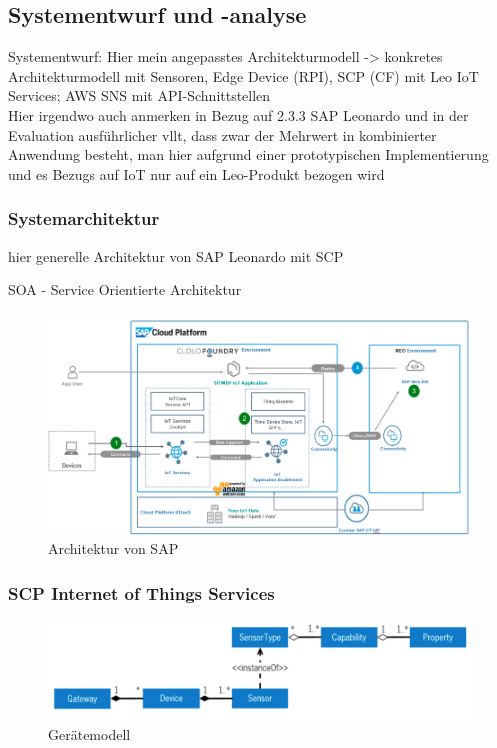 \subsection{Systementwurf und -analyse}
Systementwurf: Hier mein angepasstes Architekturmodell -> konkretes Architekturmodell mit Sensoren, Edge Device (RPI), SCP (CF) mit Leo IoT Services; AWS SNS mit API-Schnittstellen
\\Hier irgendwo auch anmerken in Bezug auf 2.3.3 SAP Leonardo und in der Evaluation ausführlicher vllt, dass zwar der Mehrwert in kombinierter Anwendung besteht, man hier aufgrund einer prototypischen Implementierung und es Bezugs auf IoT nur auf ein Leo-Produkt bezogen wird

\subsubsection{Systemarchitektur}

hier generelle Architektur von SAP Leonardo mit SCP

SOA - Service Orientierte Architektur
\begin{figure}[H]
    \centering
    \includegraphics[width=1.0\linewidth]{pictures/sap_architecture}
    \caption[Referenzarchitektur von SAP]{Architektur von SAP \citep{Ganz2019}}
    \label{fig:filename_without_extension}
\end{figure}

\subsubsection{SCP Internet of Things Services}

\begin{figure}[H]
  \centering
  \includegraphics[width=1.0\linewidth]{pictures/device_model}
  \caption[Gerätemodell]{Gerätemodell}
  \label{fig:filename_without_extension}
\end{figure}

